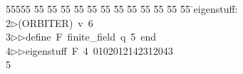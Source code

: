 %
%
\begin{tabbing}
55555 \= 55 \= 55 \= 55 \= 55 \= 55 \= 55 \= 55 \= 55 \= 55 \= 55 \= 55 \= 55 \= \>eigenstuff:\\[0pt]
2\>$\triangleright$\>(ORBITER)\ v\ 6\ \\[0pt]
3\>$\triangleright$\>$\triangleright$\>define\ F\ finite\_field\ q\ 5\ end\ \\[0pt]
4\>$\triangleright$\>$\triangleright$\>eigenstuff\ F\ 4\ 0102012142312043\ \\[0pt]
5\>\end{tabbing}
